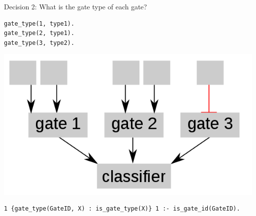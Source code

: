 \documentclass[10pt,dvipsnames]{beamer}
\begin{document}
\begin{frame}[fragile]{Decision 2: What is the gate type of each gate?}
\small
\begin{minipage}{0.3\textwidth}
\color{my_example_color}
\begin{verbatim}
gate_type(1, type1).
gate_type(2, type1).
gate_type(3, type2).
\end{verbatim}
\end{minipage}
\hfill
\begin{minipage}{0.6\textwidth}
\begin{center}
\includegraphics[scale=0.3]{exp2.png}
\end{center}
\end{minipage}
\vspace{1.3cm}
\begin{verbatim}
1 {gate_type(GateID, X) : is_gate_type(X)} 1 :- is_gate_id(GateID).
\end{verbatim}
\end{frame}
\end{document}
